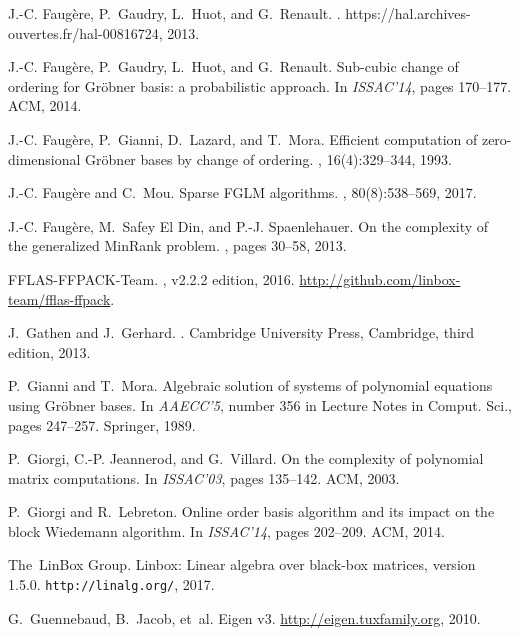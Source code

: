 \documentclass[12pt]{article}
\begin{document}
\begin{thebibliography}{10}
J.-C. Faug{\`e}re, P.~Gaudry, L.~Huot, and G.~Renault.
.
\newblock https://hal.archives-ouvertes.fr/hal-00816724, 2013.

J.-C. Faug\`{e}re, P.~Gaudry, L.~Huot, and G.~Renault.
\newblock Sub-cubic change of ordering for {G}r{\"o}bner basis: a probabilistic
  approach.
\newblock In {\em ISSAC'14}, pages 170--177. ACM, 2014.

J.-C. Faug\`ere, P.~Gianni, D.~Lazard, and T.~Mora.
\newblock Efficient computation of zero-dimensional {G}r\"obner bases by change
  of ordering.
, 16(4):329--344, 1993.

J.-C. Faug{\`e}re and C.~Mou.
\newblock Sparse {FGLM} algorithms.
, 80(8):538--569, 2017.

J.-C. Faug\`ere, M.~{Safey El Din}, and P.-J. Spaenlehauer.
\newblock On the complexity of the generalized {M}in{R}ank problem.
, pages 30--58, 2013.

FFLAS-FFPACK-Team.
, v2.2.2 edition, 2016.
\newblock \url{http://github.com/linbox-team/fflas-ffpack}.

J.~Gathen and J.~Gerhard.
.
\newblock Cambridge University Press, Cambridge, third edition, 2013.

P.~Gianni and T.~Mora.
\newblock Algebraic solution of systems of polynomial equations using
  {G}r\"obner bases.
\newblock In {\em AAECC'5}, number 356 in Lecture Notes in Comput. Sci., pages
  247--257. Springer, 1989.

P.~Giorgi, C.-P. Jeannerod, and G.~Villard.
\newblock On the complexity of polynomial matrix computations.
\newblock In {\em ISSAC'03}, pages 135--142. ACM, 2003.

P.~Giorgi and R.~Lebreton.
\newblock Online order basis algorithm and its impact on the block {W}iedemann
  algorithm.
\newblock In {\em ISSAC'14}, pages 202--209. ACM, 2014.

The~LinBox Group.
\newblock Linbox: Linear algebra over black-box matrices, version 1.5.0.
\newblock \texttt{http://linalg.org/}, 2017.

G.~Guennebaud, B.~Jacob, et~al.
\newblock Eigen v3.
\newblock \url{http://eigen.tuxfamily.org}, 2010.


\end{thebibliography}
\end{document}
